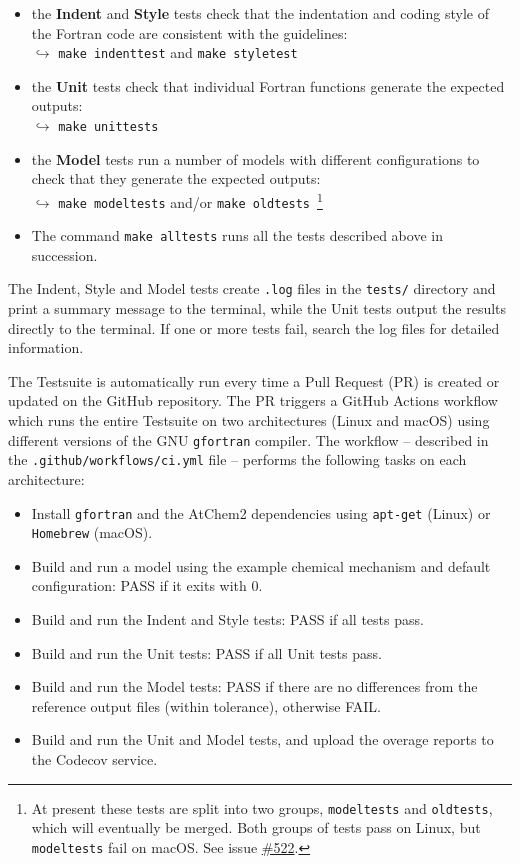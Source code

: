 \begin{itemize}
\item the \textbf{Indent} and \textbf{Style} tests check that the
  indentation and coding style of the Fortran code are consistent with
  the guidelines:\\
  $\hookrightarrow$ \verb|make indenttest| and \verb|make styletest|
\item the \textbf{Unit} tests check that individual Fortran functions
  generate the expected outputs:\\
  $\hookrightarrow$ \verb|make unittests|
\item the \textbf{Model} tests run a number of models with different
  configurations to check that they generate the expected outputs:\\
  $\hookrightarrow$ \verb|make modeltests| and/or
  \verb|make oldtests|~\footnote{At present these tests are split into
    two groups, \texttt{modeltests} and \texttt{oldtests}, which will
    eventually be merged. Both groups of tests pass on Linux, but
    \texttt{modeltests} fail on macOS. See issue
    \href{https://github.com/AtChem/AtChem2/issues/522}{\#522}.}
\item The command \verb|make alltests| runs all the tests described
  above in succession.
\end{itemize}

The Indent, Style and Model tests create \texttt{.log} files in the
\texttt{tests/} directory and print a summary message to the terminal,
while the Unit tests output the results directly to the terminal. If
one or more tests fail, search the log files for detailed information.

The Testsuite is automatically run every time a Pull Request (PR) is
created or updated on the GitHub repository. The PR triggers a GitHub
Actions workflow which runs the entire Testsuite on two architectures
(Linux and macOS) using different versions of the GNU
\texttt{gfortran} compiler. The workflow -- described in the
\texttt{.github/workflows/ci.yml} file -- performs the following tasks
on each architecture:

\begin{itemize}
\item Install \texttt{gfortran} and the AtChem2 dependencies using
  \texttt{apt-get} (Linux) or \texttt{Homebrew} (macOS).
\item Build and run a model using the example chemical mechanism and
  default configuration: PASS if it exits with 0.
\item Build and run the Indent and Style tests: PASS if all tests pass.
\item Build and run the Unit tests: PASS if all Unit tests pass.
\item Build and run the Model tests: PASS if there are no differences
  from the reference output files (within tolerance), otherwise FAIL.
\item Build and run the Unit and Model tests, and upload the overage
  reports to the Codecov service.
\end{itemize}

